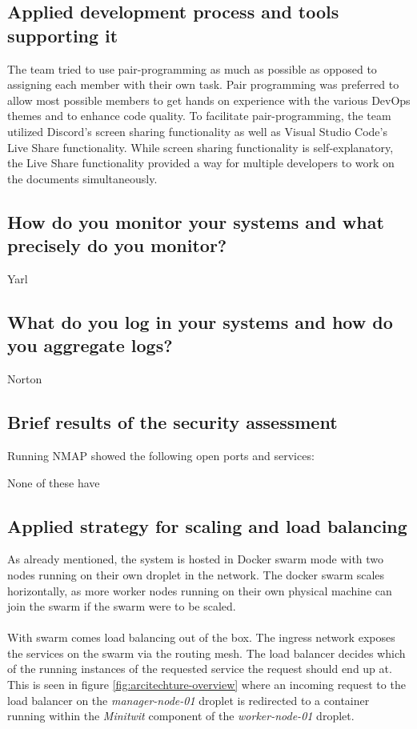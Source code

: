 \subsection{Applied development process and tools supporting it}
The team tried to use pair-programming as much as possible as opposed to assigning each member with their own task. Pair programming was preferred to allow most possible members to get hands on experience with the various DevOps themes and to enhance code quality. To facilitate pair-programming, the team utilized Discord's screen sharing functionality as well as Visual Studio Code's Live Share functionality\cite{live_share}. While screen sharing functionality is self-explanatory, the Live Share functionality provided a way for multiple developers to work on the documents simultaneously. 

\subsection{How do you monitor your systems and what precisely do you monitor?}
Yarl

\subsection{What do you log in your systems and how do you aggregate logs?}
Norton

\subsection{Brief results of the security assessment}
Running NMAP showed the following open ports and services:

None of these have 

\subsection{Applied strategy for scaling and load balancing}
As already mentioned, the system is hosted in Docker swarm mode with two nodes running on their own droplet in the network. The docker swarm scales horizontally, as more worker nodes running on their own physical machine can join the swarm if the swarm were to be scaled. \\
\\
With swarm comes load balancing out of the box. The ingress network exposes the services on the swarm via the routing mesh. The load balancer decides which of the running instances of the requested service the request should end up at\cite{docker-ingress}. This is seen in figure \ref{fig:arcitechture-overview} where an incoming request to the load balancer on the \textit{manager-node-01} droplet is redirected to a container running within the \textit{Minitwit} component of the \textit{worker-node-01} droplet.